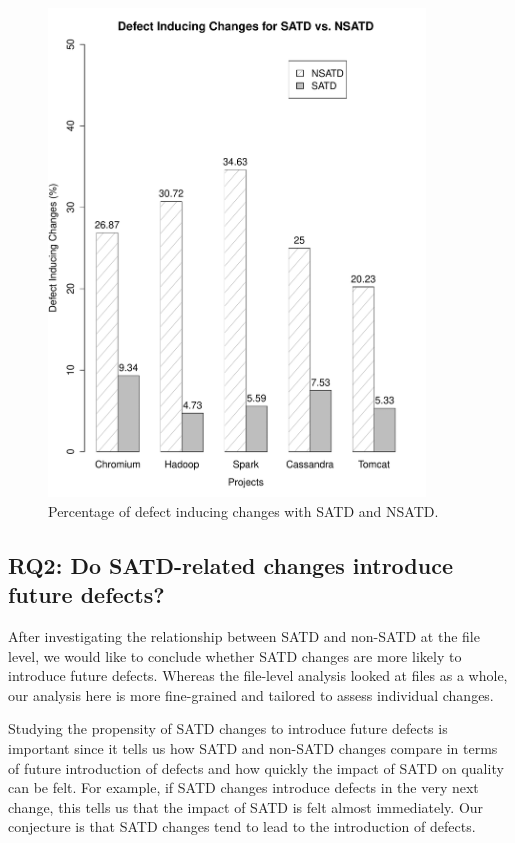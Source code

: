 \begin{figure}[tb!]
	\centering
	\includegraphics[width=100mm]{figures/chapter3/bug_inducing_changes}
	\caption{Percentage of defect inducing changes with SATD and NSATD.}
	\label{figure:bug_inducing_changes}
\end{figure}

\subsection*{RQ2: Do SATD-related changes introduce future defects?}

 After investigating the relationship between SATD and non-SATD at the file level, we would like to conclude whether SATD changes are more likely to introduce future defects. Whereas the file-level analysis looked at files as a whole, our analysis here is more fine-grained and tailored to assess individual changes.

Studying the propensity of SATD changes to introduce future defects is important since it tells us how SATD and non-SATD changes compare in terms of future introduction of defects and how quickly the impact of SATD on quality can be felt. For example, if SATD changes introduce defects in the very next change, this tells us that the impact of SATD is felt almost immediately. Our conjecture is that SATD changes tend to lead to the introduction of defects.


